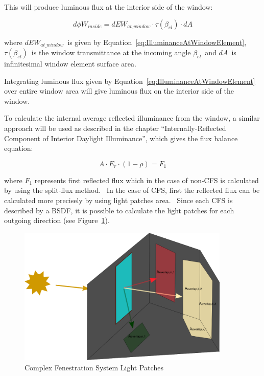 This will produce luminous flux at the interior side of the window:

\begin{equation}
d\phi {W_{inside}} = dE{W_{at\_window}} \cdot \tau ({\beta_{el}}) \cdot dA
\end{equation}

where \(dE{W_{at\_window}}\)~is given by Equation~\ref{eq:IlluminanceAtWindowElement}, \(\tau ({\beta_{el}})\)~is the window transmittance at the incoming angle \({\beta_{el}}\)~and \(dA\)~is infinitesimal window element surface area.

Integrating luminous flux given by Equation~\ref{eq:IlluminanceAtWindowElement} over entire window area will give luminous flux on the interior side of the window.

To calculate the internal average reflected illuminance from the window, a similar approach will be used as described in the chapter ``Internally-Reflected Component of Interior Daylight Illuminance'', which gives the flux balance equation:

\begin{equation}
A \cdot {E_r} \cdot (1 - \rho ) = {F_1}
\end{equation}

where \({F_1}\) represents first reflected flux which in the case of non-CFS is calculated by using the split-flux method.~ In the case of CFS, first the reflected flux can be calculated more precisely by using light patches area.~ Since each CFS is described by a BSDF, it is possible to calculate the light patches for each outgoing direction (see Figure~\ref{fig:complex-fenestration-system-light-patches}).

\begin{figure}[hbtp] %
\centering
\includegraphics[width=0.9\textwidth, height=0.9\textheight, keepaspectratio=true]{media/image842.png}
\caption{Complex Fenestration System Light Patches \protect \label{fig:complex-fenestration-system-light-patches}}
\end{figure}


